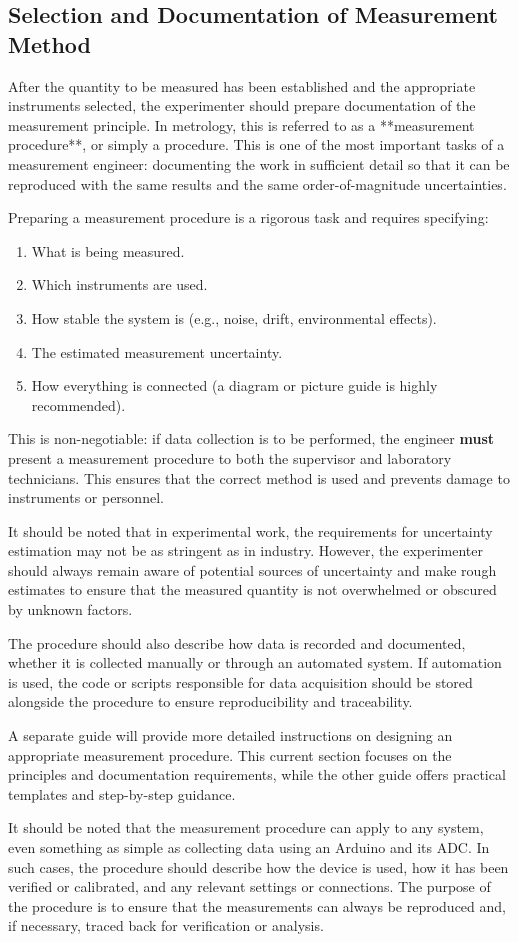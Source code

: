 \subsection{Selection and Documentation of Measurement Method}

After the quantity to be measured has been established and the appropriate instruments selected, the experimenter should prepare documentation of the measurement principle. In metrology, this is referred to as a **measurement procedure**, or simply a procedure. This is one of the most important tasks of a measurement engineer: documenting the work in sufficient detail so that it can be reproduced with the same results and the same order-of-magnitude uncertainties.

Preparing a measurement procedure is a rigorous task and requires specifying:

\begin{enumerate}
\item What is being measured.
\item Which instruments are used.
\item How stable the system is (e.g., noise, drift, environmental effects).
\item The estimated measurement uncertainty.
\item How everything is connected (a diagram or picture guide is highly recommended).
\end{enumerate}

This is non-negotiable: if data collection is to be performed, the engineer \textbf{must} present a measurement procedure to both the supervisor and laboratory technicians. This ensures that the correct method is used and prevents damage to instruments or personnel.

It should be noted that in experimental work, the requirements for uncertainty estimation may not be as stringent as in industry. However, the experimenter should always remain aware of potential sources of uncertainty and make rough estimates to ensure that the measured quantity is not overwhelmed or obscured by unknown factors.

The procedure should also describe how data is recorded and documented, whether it is collected manually or through an automated system. If automation is used, the code or scripts responsible for data acquisition should be stored alongside the procedure to ensure reproducibility and traceability.


A separate guide will provide more detailed instructions on designing an appropriate measurement procedure. This current section focuses on the principles and documentation requirements, while the other guide offers practical templates and step-by-step guidance.

It should be noted that the measurement procedure can apply to any system, even something as simple as collecting data using an Arduino and its ADC. In such cases, the procedure should describe how the device is used, how it has been verified or calibrated, and any relevant settings or connections. The purpose of the procedure is to ensure that the measurements can always be reproduced and, if necessary, traced back for verification or analysis.
